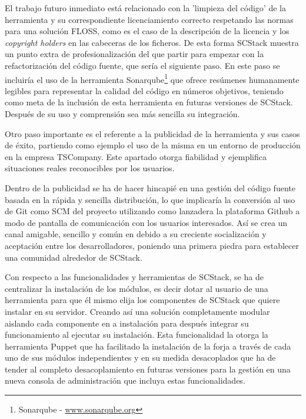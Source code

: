 \par El trabajo futuro inmediato está relacionado con la 'limpieza del código' de la herramienta y su correspondiente licenciamiento correcto respetando las normas para una solución FLOSS, como es el caso de la descripción de la licencia y los \emph{copyright holders} en las cabeceras de los ficheros. De esta forma SCStack muestra un punto extra de profesionalización del que partir para empezar con la refactorización del código fuente, que sería el siguiente paso. En este paso se incluiría el uso de la herramienta Sonarqube\footnote{Sonarqube - \url{www.sonarqube.org}} que ofrece resúmenes humanamente legibles para representar la calidad del código en números objetivos, teniendo como meta de la inclusión de esta herramienta en futuras versiones de SCStack. Después de su uso y comprensión sea más sencilla su integración.

\par Otro paso importante es el referente a la publicidad de la herramienta y sus casos de éxito, partiendo como ejemplo el uso de la misma en un entorno de producción en la empresa TSCompany. Este apartado otorga fiabilidad y ejemplifica situaciones reales reconocibles por los usuarios.

\par Dentro de la publicidad se ha de hacer hincapié en una gestión del código fuente basada en la rápida y sencilla distribución, lo que implicaría la conversión al uso de Git como SCM del proyecto utilizando como lanzadera la plataforma Github a modo de pantalla de comunicación con los usuarios interesados. Así se crea un canal amigable, sencillo y común en debido a su creciente socialización y aceptación entre los desarrolladores, poniendo una primera piedra para establecer una comunidad alrededor de SCStack.

\par Con respecto a las funcionalidades y herramientas de SCStack, se ha de centralizar la instalación de los módulos, es decir dotar al usuario de una herramienta para que él mismo elija los componentes de SCStack que quiere instalar en su servidor. Creando así una solución completamente modular aislando cada componente en a instalación para después integrar su funcionamiento al ejecutar su instalación. Esta funcionalidad la otorga la herramienta Puppet que ha facilitado la instalación de la forja a través de cada uno de sus módulos independientes y en su medida desacoplados que ha de tender al completo desacoplamiento en futuras versiones para la gestión en una nueva consola de administración que incluya estas funcionalidades.

